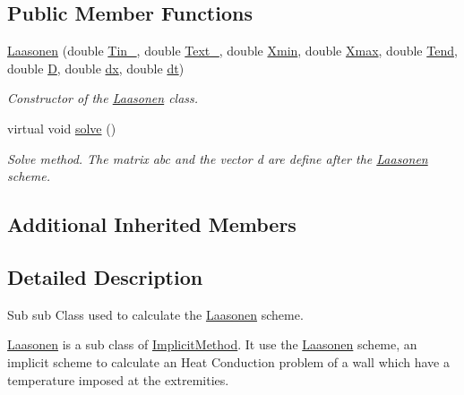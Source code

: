 \subsection*{Public Member Functions}
\begin{DoxyCompactItemize}
\item 
\hyperlink{class_laasonen_a31c8458bc908b985f992560b995b8d56}{Laasonen} (double \hyperlink{class_heat_conduction_a2487010bf67582643ff59c0c5167725e}{Tin\+\_}, double \hyperlink{class_heat_conduction_aeb50fb3189fd6545f765ef73c9be7889}{Text\+\_}, double \hyperlink{class_heat_conduction_a6ccf374e13ab91b2403db617c9e7a8f0}{Xmin}, double \hyperlink{class_heat_conduction_a187dd05134300536dd9b5418e2957e9a}{Xmax}, double \hyperlink{class_heat_conduction_ab1d00caf79f4c04b420189eaf7c666e1}{Tend}, double \hyperlink{class_heat_conduction_a197d8aa3aa8619edaa640c243bdfc793}{D}, double \hyperlink{class_heat_conduction_a208bf1f475147b07a1f7d28533d78d9c}{dx}, double \hyperlink{class_heat_conduction_a7a7d5f6631039781c80b8c0c60e540e6}{dt})
\begin{DoxyCompactList}\small\item\em Constructor of the \hyperlink{class_laasonen}{Laasonen} class. \end{DoxyCompactList}\item 
virtual void \hyperlink{class_laasonen_a53cf5a72691175df0b3b6bdcbfee8c9b}{solve} ()
\begin{DoxyCompactList}\small\item\em Solve method. The matrix abc and the vector d are define after the \hyperlink{class_laasonen}{Laasonen} scheme. \end{DoxyCompactList}\end{DoxyCompactItemize}
\subsection*{Additional Inherited Members}


\subsection{Detailed Description}
Sub sub Class used to calculate the \hyperlink{class_laasonen}{Laasonen} scheme. 

\hyperlink{class_laasonen}{Laasonen} is a sub class of \hyperlink{class_implicit_method}{Implicit\+Method}. It use the \hyperlink{class_laasonen}{Laasonen} scheme, an implicit scheme to calculate an Heat Conduction problem of a wall which have a temperature imposed at the extremities. 

